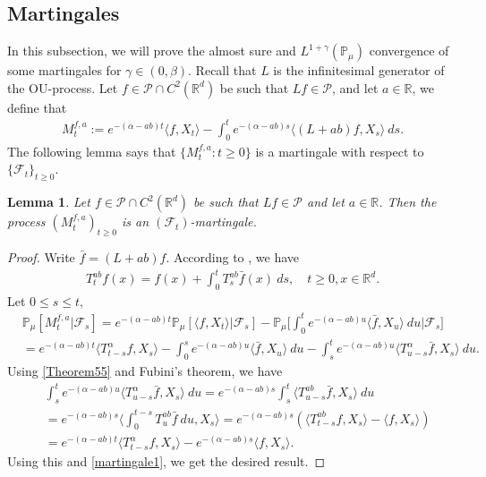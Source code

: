\documentclass[12pt]{amsart}
\theoremstyle{plain}
\newtheorem{lem}[thm]{Lemma}
\theoremstyle{definition}
\numberwithin{equation}{section}
\begin{document}
\subsection{Martingales}
    In this subsection, we will prove the almost sure and $L^{1+\gamma}(\mathbb{P}_{\mu})$ convergence of some martingales for $\gamma\in (0, \beta)$. Recall that $L$ is the infinitesimal generator of the OU-process. Let $f\in \mathcal{P}\cap C^2(\mathbb{R}^d)$ be such that $Lf \in \mathcal{P}$, and let $a\in \mathbb{R}$, we define that
\begin{align}
\label{defmartingale}
    M_t^{f,a}:=e^{-(\alpha-ab)t}\langle f,X_t\rangle-\int_0^t e^{-(\alpha-ab)s}\langle (L+ab)f, X_s\rangle~ ds.
\end{align}
    The following lemma says that $\{M_t^{f,a}: t\geq 0\}$ is a martingale with respect to $\{\mathscr{F}_t\}_{t\geq 0}$.
\begin{lem}
\label{lemma25}
    Let $f\in \mathcal{P}\cap C^2(\mathbb{R}^d)$ be such that $Lf \in \mathcal{P}$ and let $a\in \mathbb R$. Then the process $(M_t^{f,a})_{t\geq 0}$ is an $(\mathscr F_t)$-martingale.
\end{lem}
\begin{proof}
    Write $\bar{f}=(L+ab)f$. According to \cite[Theorem A.55]{Li2011Measure-valued}, we have
\begin{align}\label{Theorem55}
    T_t^{ab}f(x)= f(x)+\int_0^t T_s^{ab}\bar{f}(x)~ds,\quad t\geq 0,x\in \mathbb{R}^d.
\end{align}
Let $0\leq s\leq t$,
\begin{align}
\label{martingale1}
    &\mathbb{P}_{\mu}[M_t^{f,a}|\mathscr{F}_s]
    =e^{-(\alpha-ab)t}\mathbb{P}_{\mu}\left[\langle f,X_t\rangle|\mathscr{F}_s\right]-\mathbb{P}_{\mu}\Big[\int_0^t e^{-(\alpha-ab)u}\langle \bar{f}, X_u\rangle~ du\Big|\mathscr{F}_s\big]
    \\&=e^{-(\alpha-ab)t}\langle T_{t-s}^{\alpha}f, X_s\rangle-\int_0^s e^{-(\alpha-ab)u}\langle \bar{f}, X_u\rangle~ du -\int_s^t e^{-(\alpha-ab)u}\langle T_{u-s}^{\alpha} \bar{f},X_s\rangle~ du.
\end{align}
    Using \eqref{Theorem55} and Fubini's theorem, we have
\begin{align}
    &\int_s^t e^{-(\alpha-ab)u}\langle T_{u-s}^{\alpha} \bar{f},X_s\rangle~ du=e^{-(\alpha-ab)s}\int_s^t\langle T_{u-s}^{ab}\bar{f},X_s\rangle~du\\
    &=e^{-(\alpha-ab)s}\Big\langle\int_0^{t-s}T_{u}^{ab}\bar{f}~du,X_s\Big\rangle=e^{-(\alpha-ab)s}\left(\langle T_{t-s}^{ab}f,X_s\rangle-\langle
    f,X_s\rangle\right)\\
    &=e^{-(\alpha-ab)t}\langle T_{t-s}^{\alpha}f, X_s\rangle-e^{-(\alpha-ab)s}\langle
    f,X_s\rangle.
\end{align}
   Using this and \eqref{martingale1}, we get the desired result.
\end{proof}
\end{document}
